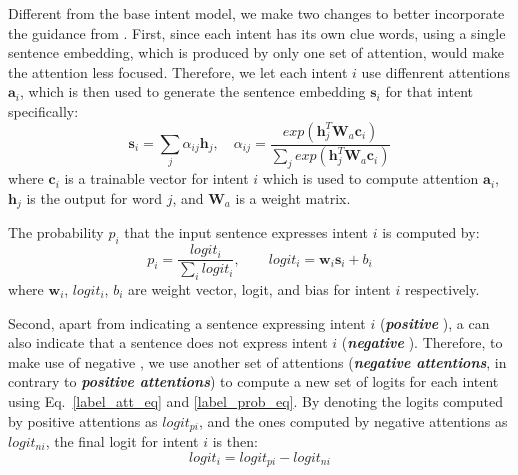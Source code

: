 Different from the base intent model, we make two changes to better incorporate the guidance from \RE.
First, since each intent has its own clue words, using a single sentence embedding, which is produced by only one set of attention, would make the attention less focused.
Therefore, we let each intent $i$ use diffenrent attentions $\textbf{a}_i$, which is then used to generate the sentence embedding $\textbf{s}_i$ for that intent specifically:
\begin{equation}
\textbf{s}_i = \sum_{j}{\alpha_{ij}\textbf{h}_j}, \quad
\alpha_{ij}=\frac{exp(\textbf{h}_j^T\textbf{W}_a\textbf{c}_i)}{\sum_{j}{exp(\textbf{h}_j^T\textbf{W}_a\textbf{c}_i)}}
\label{label_att_eq}
\end{equation}
where $\textbf{c}_i$ is a trainable vector for intent $i$ which is used to compute attention $\textbf{a}_i$, $\textbf{h}_j$ is the \BLSTM output for word $j$, and $\textbf{W}_a$ is a weight matrix.

The probability $p_i$ that the input sentence expresses intent $i$ is computed by:
\begin{equation}
p_i = \frac{logit_i}{\sum_{i}{logit_i}}, \quad\quad logit_i=\textbf{w}_i\textbf{s}_i + b_i
\label{label_prob_eq}
\end{equation}
where $\textbf{w}_i$, $logit_i$, $b_i$ are weight vector, logit, and bias for intent $i$ respectively.

Second, apart from indicating a sentence expressing intent $i$ (\textbf{\emph{positive \REs}}), a \RE can also indicate that a sentence does not express intent $i$ (\textbf{\emph{negative \REs}}). Therefore, to make use of negative \REs, we use another set of attentions (\textbf{\emph{negative attentions}}, in contrary to \textbf{\emph{positive attentions}}) to compute a new set of logits for each intent using Eq.~\ref{label_att_eq} and \ref{label_prob_eq}.
By denoting the logits computed by positive attentions as $logit_{pi}$, and the ones computed by negative attentions as $logit_{ni}$, the final logit for intent $i$ is then:
\begin{equation}
logit_i = logit_{pi} - logit_{ni}
\end{equation}

